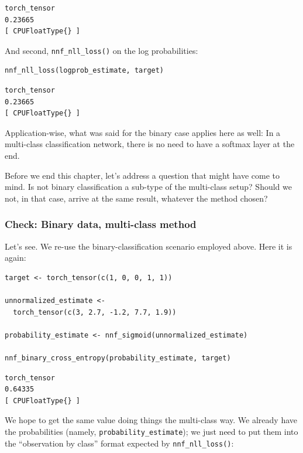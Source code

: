 \documentclass[
  letterpaper,
]{krantz}
\begin{document}
\begin{verbatim}
torch_tensor
0.23665
[ CPUFloatType{} ]
\end{verbatim}

And second, \texttt{nnf\_nll\_loss()} on the log
probabilities:

\begin{verbatim}
nnf_nll_loss(logprob_estimate, target)
\end{verbatim}

\begin{verbatim}
torch_tensor
0.23665
[ CPUFloatType{} ]
\end{verbatim}

Application-wise, what was said for the binary case applies here as
well: In a multi-class classification network, there is no need to have
a softmax layer at the end.

Before we end this chapter, let's address a question that might have
come to mind. Is not binary classification a sub-type of the multi-class
setup? Should we not, in that case, arrive at the same result, whatever
the method chosen?

\hypertarget{check-binary-data-multi-class-method}{%
\subsubsection{Check: Binary data, multi-class
method}\label{check-binary-data-multi-class-method}}

Let's see. We re-use the binary-classification scenario employed above.
Here it is again:

\begin{verbatim}
target <- torch_tensor(c(1, 0, 0, 1, 1))

unnormalized_estimate <- 
  torch_tensor(c(3, 2.7, -1.2, 7.7, 1.9))

probability_estimate <- nnf_sigmoid(unnormalized_estimate)

nnf_binary_cross_entropy(probability_estimate, target)
\end{verbatim}

\begin{verbatim}
torch_tensor
0.64335
[ CPUFloatType{} ]
\end{verbatim}

We hope to get the same value doing things the multi-class way. We
already have the probabilities (namely, \texttt{probability\_estimate});
we just need to put them into the ``observation by class'' format
expected by \texttt{nnf\_nll\_loss()}:
\end{document}
